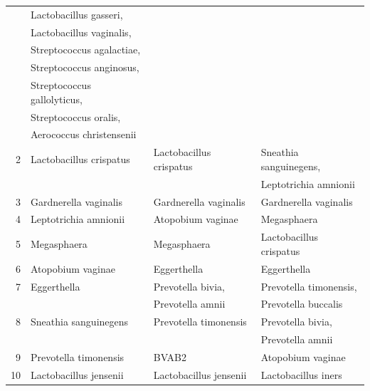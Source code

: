 \begin{table}[!tbp]
{\begin{center}
\begin{tabular}{rlll}
\rc{}        & Lactobacillus gasseri,       &                         &     \\
\rc{}        & Lactobacillus vaginalis,     &                         &     \\
\rc{}        & Streptococcus agalactiae,    &                         &     \\
\rc{}        & Streptococcus anginosus,     &                         &     \\
\rc{}        & Streptococcus gallolyticus,  &                         &     \\
\rc{}        & Streptococcus oralis,        &                         &     \\
\rc{}        & Aerococcus christensenii     &                         &     \\
        2    & Lactobacillus crispatus      & Lactobacillus crispatus & Sneathia sanguinegens,     \\
             &                              &                         & Leptotrichia amnionii      \\
\rc{}   3    & Gardnerella vaginalis        & Gardnerella vaginalis   & Gardnerella vaginalis      \\
        4    & Leptotrichia amnionii        & Atopobium vaginae       & Megasphaera                \\
\rc{}   5    & Megasphaera                  & Megasphaera             & Lactobacillus crispatus    \\
        6    & Atopobium vaginae            & Eggerthella             & Eggerthella                \\
\rc{}   7    & Eggerthella                  & Prevotella bivia,       & Prevotella timonensis,     \\
\rc{}        &                              & Prevotella amnii        & Prevotella buccalis        \\
        8    & Sneathia sanguinegens        & Prevotella timonensis   & Prevotella bivia,          \\
             &                              &                         & Prevotella amnii           \\
\rc{}   9    & Prevotella timonensis        & BVAB2                   & Atopobium vaginae          \\
       10    & Lactobacillus jensenii       & Lactobacillus jensenii  & Lactobacillus iners        \\
        \bottomrule
    \end{tabular}
    \end{center}
}
\end{table}

